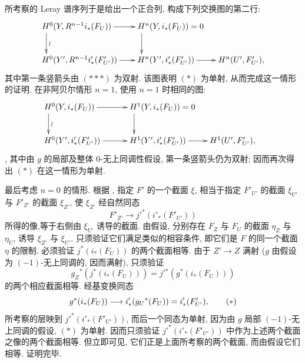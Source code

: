 所考察的 Leray 谱序列于是给出一个正合列, 构成下列交换图的第二行:
$$
\xymatrix{
**[r]H^{0}(Y,R^{n-1} i_{\ast}(F_U))  \ar[r] \ar[d]^{\text{\rotatebox{90}{$\sim$}}}&
**[r]H^n(Y,i_{\ast} (F_U)) = 0 \ar[d]\\
**[r]H^{0}(Y', R^{n-1} i'_{\ast}(F'_{U'}))  \ar[r] &
**[r]H^{n}(Y',i'_{\ast}(F'_{U'}))  \ar[r] & **[r]H^{n}(U',F'_{U'}),
}
$$
其中第一条竖箭头由 $({\ast}{\ast}{\ast})$ 为双射. 该图表明 $(\ast)$ 为单射, 从而完成这一情形的证明. 在非阿贝尔情形 $n=1$, 使用 $n=1$ 时相同的图:
$$
\xymatrix{
**[r]H^{0}(Y, i_{\ast}(F_U))  \ar[r] \ar[d]^{\text{\rotatebox{90}{$\sim$}}}&
**[r]H^1(Y,i_{\ast} (F_U)) = 0 \ar[d]\\
**[r]H^{0}(Y', i'_{\ast}(F'_{U'}))  \ar[r] &
**[r]H^{1}(Y',i'_{\ast}(F'_{U'}))  \ar[r] & **[r]H^{1}(U',F'_{U'}),&
}
$$
, 其中由 $g$ 的局部及整体 $0$-无上同调性假设, 第一条竖箭头仍为双射; 因而再次得出 $(\ast)$ 在这一情形为单射.

最后考虑 $n=0$ 的情形. 根据 \sisi{\qquad}{\qquad}, 指定 $F'$ 的一个截面 $\xi$, 相当于指定 $F'_{U'}$ 的截面 $\xi_{U'}$ 与 $F'_{Z'}$ 的截面 $\xi_{Z'}$,
使 $\xi_{Z'}$ 经自然同态
$$
F'_{Z'}\longrightarrow {j'}^{\ast}(i'_{\ast}(F'_{U'}))
$$
所得的像,\pageoriginale 等于右侧由 $\xi_{U'}$ 诱导的截面. 由假设, 分别存在 $F_Z$ 与 $F_U$ 的截面 $\eta_Z$ 与 $\eta_U$, 诱导 $\xi_{Z'}$ 与 $\xi_{U'}$. 只须验证它们满足类似的相容条件, 即它们是 $F$ 的同一个截面 $\eta$ 的限制. 必须验证 $j^{\ast}(i_{\ast}(F_U))$ 的两个截面相等. 由于 $Z'\rightarrow Z$ 满射 ($g$ 由假设为 $(-1)$-无上同调的, 因而满射), 只须验证
$$
g_Z{}^{\ast}(j^{\ast}(i_{\ast}(F_U)))
=j'{}^{\ast}(g^{\ast}(i_{\ast}(F_U)))
$$
的两个相应截面相等. 经基变换同态
\begin{equation*}
g^{\ast}(i_{\ast}(F_U))\longrightarrow
i'_{\ast}(g_U{}^{\ast}(F_U))=i'_{\ast}(F'_{U'}){},\tag{$\ast$}
\end{equation*}
所考察的层映到 ${j'}^{\ast}(i'_{\ast}(F'_{U'}))$, 而后一个同态为单射, 因为由 $g$ 局部 $(-1)$-无上同调的假设, $(\ast)$ 为单射. 因而只须验证 ${j'}^{\ast}(i'_{\ast}(F'_{U'}))$ 中作为上述两个截面之像的两个截面相等. 但立即可见, 它们正是上面所考察的两个截面, 而由假设它们相等. 证明完毕.

